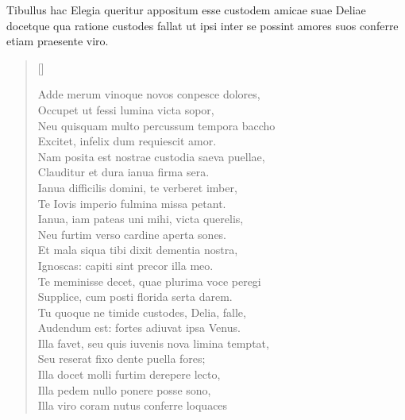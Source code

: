 
Tibullus hac Elegia queritur appositum esse custodem amicae suae Deliae docetque qua ratione custodes fallat ut ipsi inter se possint amores suos conferre etiam praesente viro. 








\settowidth{\versewidth}{Nec tamen huic credet coniunx tuus, ut mihi verax}
\begin{verse}[\versewidth]
\begin{altverse}
{\large
Adde merum vinoque novos conpesce dolores,\\
Occupet ut fessi lumina victa sopor,\\
Neu quisquam multo percussum tempora baccho\\
Excitet, infelix dum requiescit amor.\\
Nam posita est nostrae custodia saeva puellae,\\
Clauditur et dura ianua firma sera.\\
Ianua difficilis domini, te verberet imber,\\
Te Iovis imperio fulmina missa petant.\\
Ianua, iam pateas uni mihi, victa querelis,\\
Neu furtim verso cardine aperta sones.\\
Et mala siqua tibi dixit dementia nostra,\\
Ignoscas: capiti sint precor illa meo.\\
Te meminisse decet, quae plurima voce peregi\\
Supplice, cum posti florida serta darem.\\
Tu quoque ne timide custodes, Delia, falle,\\
Audendum est: fortes adiuvat ipsa Venus.\\
Illa favet, seu quis iuvenis nova limina temptat,\\
Seu reserat fixo dente puella fores;\\
Illa docet molli furtim derepere lecto,\\
Illa pedem nullo ponere posse sono,\\
Illa viro coram nutus conferre loquaces\\
}
\end{altverse}
\end{verse}
